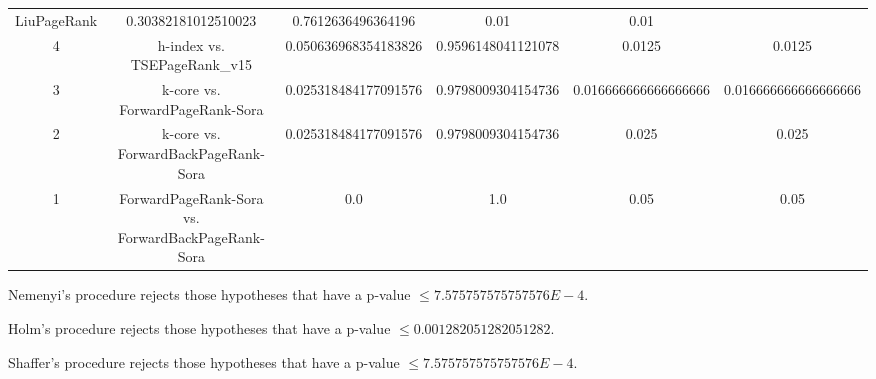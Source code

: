 \documentclass[a4paper,10pt]{article}
\begin{document}
\begin{landscape}
\begin{table}[!htp]
\begin{tabular}{cccccc}
LiuPageRank&0.30382181012510023&0.7612636496364196&0.01&0.01\\4&h-index vs. TSEPageRank_v15&0.050636968354183826&0.9596148041121078&0.0125&0.0125\\3&k-core vs. ForwardPageRank-Sora&0.025318484177091576&0.9798009304154736&0.016666666666666666&0.016666666666666666\\2&k-core vs. ForwardBackPageRank-Sora&0.025318484177091576&0.9798009304154736&0.025&0.025\\1&ForwardPageRank-Sora vs. ForwardBackPageRank-Sora&0.0&1.0&0.05&0.05\\\hline
\end{tabular}
\end{table}
Nemenyi's procedure rejects those hypotheses that have a p-value $\le7.575757575757576E-4$.


Holm's procedure rejects those hypotheses that have a p-value $\le0.001282051282051282$.


Shaffer's procedure rejects those hypotheses that have a p-value $\le7.575757575757576E-4$.



\end{landscape}
\end{document}
